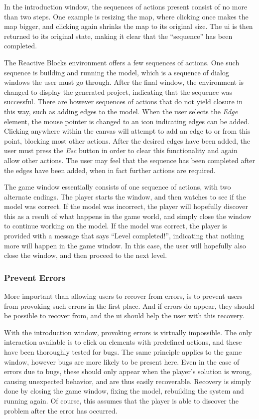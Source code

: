 \noindent
In the introduction window, the sequences of actions present consist of no more than two steps. One example is resizing the map, where clicking once makes the map bigger, and clicking again shrinks the map to its original size. The \gls{ui} is then returned to its original state, making it clear that the ``sequence'' has been completed.

\noindent
The Reactive Blocks environment offers a few sequences of actions. One such sequence is building and running the model, which is a sequence of dialog windows the user must go through. After the final window, the environment is changed to display the generated project, indicating that the sequence was successful. There are however sequences of actions that do not yield closure in this way, such as adding edges to the model. When the user selects the \emph{Edge} element, the mouse pointer is changed to an icon indicating edges can be added. Clicking anywhere within the canvas will attempt to add an edge to or from this point, blocking most other actions. After the desired edges have been added, the user must press the \emph{Esc} button in order to clear this functionality and again allow other actions. The user may feel that the sequence has been completed after the edges have been added, when in fact further actions are required.

\noindent
The game window essentially consists of one sequence of actions, with two alternate endings. The player starts the window, and then watches to see if the model was correct. If the model was incorrect, the player will hopefully discover this as a result of what happens in the game world, and simply close the window to continue working on the model. If the model was correct, the player is provided with a message that says ``Level completed!'', indicating that nothing more will happen in the game window. In this case, the user will hopefully also close the window, and then proceed to the next level.

\subsubsection{Prevent Errors}
More important than allowing users to recover from errors, is to prevent users from provoking such errors in the first place. And if errors do appear, they should be possible to recover from, and the \gls{ui} should help the user with this recovery.

\noindent
With the introduction window, provoking errors is virtually impossible. The only interaction available is to click on elements with predefined actions, and these have been thoroughly tested for bugs. The same principle applies to the game window, however bugs are more likely to be present here. Even in the case of errors due to bugs, these should only appear when the player's solution is wrong, causing unexpected behavior, and are thus easily recoverable. Recovery is simply done by closing the game window, fixing the model, rebuilding the system and running again. Of course, this assumes that the player is able to discover the problem after the error has occurred.

